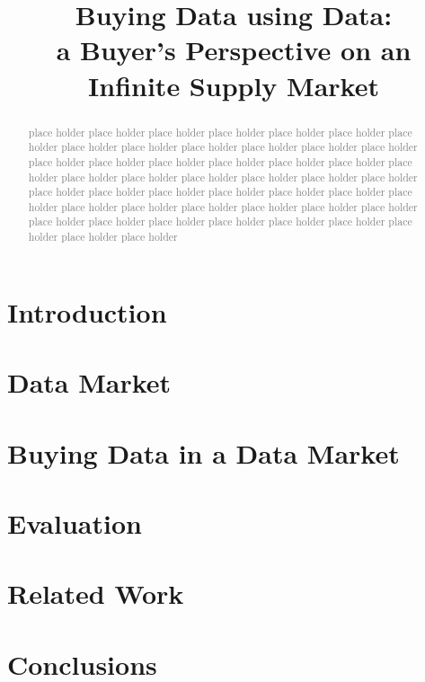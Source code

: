 \documentclass[sigconf,anonymous,review]{acmart}
\newcommand{\todo}[1]{\textcolor{gray}{{#1}}} %
\begin{document}
	\title{Buying Data using Data:\\ a Buyer's Perspective on an Infinite Supply Market}
	
	\begin{abstract}
	\todo{place holder place holder place holder place holder place holder place holder}
	\todo{place holder place holder place holder place holder place holder place holder}
	\todo{place holder place holder place holder place holder place holder place holder}
	\todo{place holder place holder place holder place holder place holder place holder}
	\todo{place holder place holder place holder place holder place holder place holder}
	\todo{place holder place holder place holder place holder place holder place holder}
	\todo{place holder place holder place holder place holder place holder place holder}
	\todo{place holder place holder place holder place holder place holder place holder}
	\end{abstract}
	\maketitle
	
	\section{Introduction}\label{sec:introduction}
	
	\section{Data Market}\label{sec:datamarket}
	
	\section{Buying Data in a Data Market}\label{sec:model}
	
	\section{Evaluation}\label{sec:eval}
	
	\section{Related Work}\label{sec:related}
	
	\section{Conclusions}\label{sec:con}
	
	
	
	
\end{document}
